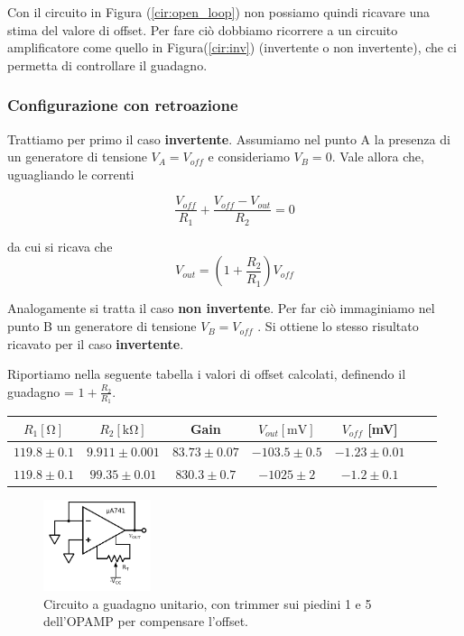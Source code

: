 Con il circuito in Figura (\ref{cir:open_loop}) non possiamo quindi ricavare una stima del valore di offset. Per fare ciò dobbiamo ricorrere a un circuito amplificatore come quello in Figura(\ref{cir:inv}) (invertente o non invertente), che ci permetta di controllare il guadagno.

\subsubsection{Configurazione con retroazione}

Trattiamo per primo il caso \textbf{invertente}. Assumiamo nel punto A la presenza di un generatore di tensione $V_A=V_{off}$ e consideriamo $V_B=0$. Vale allora che, uguagliando le correnti

$$\frac{V_{off}}{R_1} + \frac{V_{off}-V_{out}}{R_2} = 0$$

da cui si ricava che
$$V_{out}=\left(1+\frac{R_2}{R_1}\right) V_{off}$$

Analogamente si tratta il caso \textbf{non invertente}. Per far ciò immaginiamo nel punto B un generatore di tensione $V_B=V_{off}$ . Si ottiene lo stesso risultato ricavato per il caso \textbf{invertente}.


Riportiamo nella seguente tabella i valori di offset calcolati, definendo il guadagno = $1+\frac{R_2}{R_1}$. 

\begin{center}
\begin{savenotes}
\begin{tabular}{c|c|c|c|c|c|c}
$R_1[\si{\ohm}]$ & $R_2[\si{\kilo\ohm}]$ & Gain &$V_{out} [\si{\milli\volt}]$ & $V_{off}$ [\si{\milli\volt}]\\ 
\hline 
$119.8\pm0.1$ & $9.911\pm0.001$ & $83.73\pm0.07$&  $-103.5 \pm 0.5$ & $-1.23 \pm0.01$\\
\hline
$119.8\pm0.1$ & $99.35\pm0.01$ & $830.3\pm0.7$ &$ -1025 \pm 2$ & $-1.2 \pm0.1$\\

\end{tabular}
\end{savenotes}
\end{center}

\begin{figure}
  \begin{center}
    \includegraphics[width=0.280\textwidth]{../E02/latex/trimmer_correction.pdf}
  \end{center}
  \caption{Circuito a guadagno unitario, con trimmer sui piedini 1 e 5 dell'OPAMP per compensare l'offset.}
  \label{cir2:trimmer}
\end{figure}


